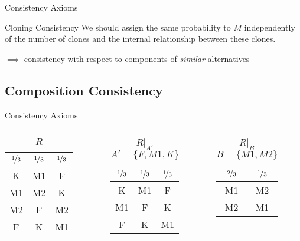 \documentclass{beamer}
\theoremstyle{definition}
\begin{document}
\begin{frame}{Consistency Axioms}
\begin{block}{Cloning Consistency}
We should assign the same probability to $M$ independently of the number of clones and the internal relationship between these clones.

$\implies$ consistency with respect to components of \emph{similar} alternatives
\end{block}
\end{frame}

\subsection{Composition Consistency}

\begin{frame}{Consistency Axioms}
\begin{columns}
\begin{column}{0.33\textwidth}
\begin{center}\begin{table}\begin{tabular}{ c|c|c } 
 $\nicefrac{1}{3}$ & $\nicefrac{1}{3}$ & $\nicefrac{1}{3}$ \\ 
 \hline\hline
 K & M1 & F \\ 
 M1 & M2 & K \\ 
 M2 & F & M2 \\ 
 F & K & M1 \\
\end{tabular}\caption{$R$}\end{table}\end{center}
\end{column}
\begin{column}{0.33\textwidth}
\begin{center}\begin{table}\begin{tabular}{ c|c|c } 
 $\nicefrac{1}{3}$ & $\nicefrac{1}{3}$ & $\nicefrac{1}{3}$ \\ 
 \hline\hline
 K & M1 & F \\ 
 M1 & F & K \\ 
 F & K & M1 \\
\end{tabular}\caption{$R|_{A'}$ \\ $A' = \{F, M1, K\}$}\end{table}\end{center}
\end{column}
\begin{column}{0.33\textwidth}
\begin{center}\begin{table}\begin{tabular}{ c|c } 
 $\nicefrac{2}{3}$ & $\nicefrac{1}{3}$ \\ 
 \hline\hline
 M1 & M2 \\ 
 M2 & M1 \\ 
\end{tabular}\caption{$R|_B$ \\ $B = \{M1, M2\}$}\end{table}\end{center}
\end{column}
\end{columns}


\end{frame}
\end{document}
